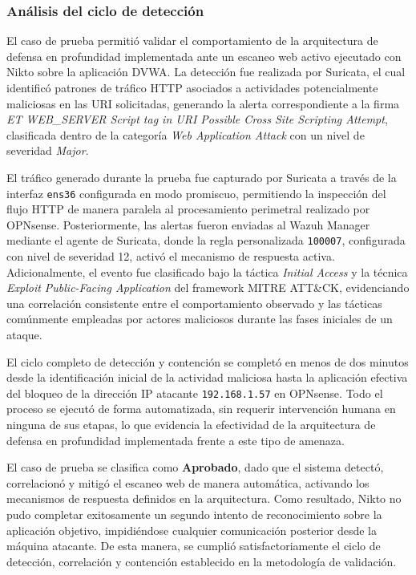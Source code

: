 \subsubsection{Análisis del ciclo de detección}
\noindent

El caso de prueba permitió validar el comportamiento de la arquitectura de defensa en profundidad implementada ante un escaneo web activo 
ejecutado con Nikto sobre la aplicación DVWA. La detección fue realizada por Suricata, el cual identificó patrones de tráfico HTTP 
asociados a actividades potencialmente maliciosas en las URI solicitadas, generando la alerta correspondiente a la firma 
\textit{ET WEB\_SERVER Script tag in URI Possible Cross Site Scripting Attempt}, clasificada dentro de la categoría 
\textit{Web Application Attack} con un nivel de severidad \textit{Major}.

El tráfico generado durante la prueba fue capturado por Suricata a través de la interfaz \texttt{ens36} configurada en modo promiscuo, 
permitiendo la inspección del flujo HTTP de manera paralela al procesamiento perimetral realizado por OPNsense. Posteriormente, las 
alertas fueron enviadas al Wazuh Manager mediante el agente de Suricata, donde la regla personalizada \texttt{100007}, configurada con 
nivel de severidad 12, activó el mecanismo de respuesta activa. Adicionalmente, el evento fue clasificado bajo la táctica 
\textit{Initial Access} y la técnica \textit{Exploit Public-Facing Application} del framework MITRE ATT\&CK, evidenciando una correlación 
consistente entre el comportamiento observado y las tácticas comúnmente empleadas por actores maliciosos durante las fases iniciales de 
un ataque.

El ciclo completo de detección y contención se completó en menos de dos minutos desde la identificación inicial de la actividad maliciosa 
hasta la aplicación efectiva del bloqueo de la dirección IP atacante \texttt{192.168.1.57} en OPNsense. Todo el proceso se ejecutó de 
forma automatizada, sin requerir intervención humana en ninguna de sus etapas, lo que evidencia la efectividad de la arquitectura de 
defensa en profundidad implementada frente a este tipo de amenaza.

El caso de prueba se clasifica como \textbf{Aprobado}, dado que el sistema detectó, correlacionó y mitigó el escaneo web de manera 
automática, activando los mecanismos de respuesta definidos en la arquitectura. Como resultado, Nikto no pudo completar exitosamente un 
segundo intento de reconocimiento sobre la aplicación objetivo, impidiéndose cualquier comunicación posterior desde la máquina atacante. 
De esta manera, se cumplió satisfactoriamente el ciclo de detección, correlación y contención establecido en la metodología de validación.

